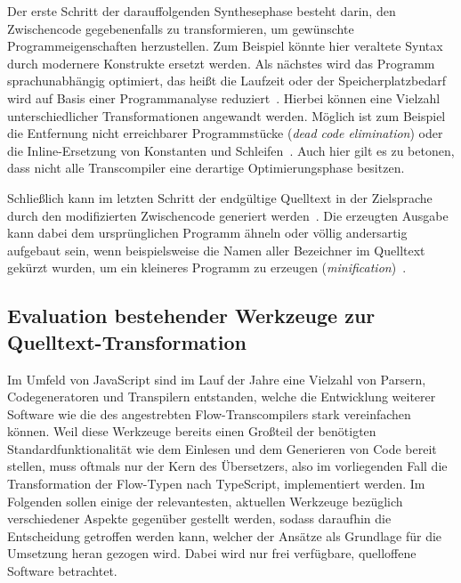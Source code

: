 Der erste Schritt der darauffolgenden Synthesephase besteht darin, den Zwischencode gegebenenfalls zu transformieren, um gewünschte Programmeigenschaften herzustellen. Zum Beispiel könnte hier veraltete Syntax durch modernere Konstrukte ersetzt werden. Als nächstes wird das Programm sprachunabhängig optimiert, das heißt die Laufzeit oder der Speicherplatzbedarf wird auf Basis einer Programmanalyse reduziert~\autocite[405]{TORCZON:2007}. Hierbei können eine Vielzahl unterschiedlicher Transformationen angewandt werden. Möglich ist zum Beispiel die Entfernung nicht erreichbarer Programmstücke (\textit{dead code elimination}) oder die Inline-Ersetzung von Konstanten und Schleifen~\autocites{TORCZON:2007}{SCHOEPP:COMPILER}. Auch hier gilt es zu betonen, dass nicht alle Transcompiler eine derartige Optimierungsphase besitzen.

Schließlich kann im letzten Schritt der endgültige Quelltext in der Zielsprache durch den modifizierten Zwischencode generiert werden~\autocite[505]{AHO:COMPILERS}. Die erzeugten Ausgabe kann dabei dem ursprünglichen Programm ähneln oder völlig andersartig aufgebaut sein, wenn beispielsweise die Namen aller Bezeichner im Quelltext gekürzt wurden, um ein kleineres Programm zu erzeugen (\textit{minification})~\autocite{FOWLER:TRANSPARENT}.

\subsection{Evaluation bestehender Werkzeuge zur Quelltext-Transformation}
\label{subsec:js-transpilers}

Im Umfeld von JavaScript sind im Lauf der Jahre eine Vielzahl von Parsern, Codegeneratoren und Transpilern entstanden, welche die Entwicklung weiterer Software wie die des angestrebten Flow-Transcompilers stark vereinfachen können. Weil diese Werkzeuge bereits einen Großteil der benötigten Standardfunktionalität wie dem Einlesen und dem Generieren von Code bereit stellen, muss oftmals nur der Kern des Übersetzers, also im vorliegenden Fall die Transformation der Flow-Typen nach TypeScript, implementiert werden. Im Folgenden sollen einige der relevantesten, aktuellen Werkzeuge bezüglich verschiedener Aspekte gegenüber gestellt werden, sodass daraufhin die Entscheidung getroffen werden kann, welcher der Ansätze als Grundlage für die Umsetzung heran gezogen wird. Dabei wird nur frei verfügbare, quelloffene Software betrachtet.

